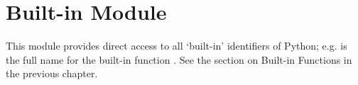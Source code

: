 \section{Built-in Module }
\label{module-builtin}

This module provides direct access to all `built-in' identifiers of
Python; e.g.  is the full name for the built-in
function .  See the section on Built-in Functions in the
previous chapter.
